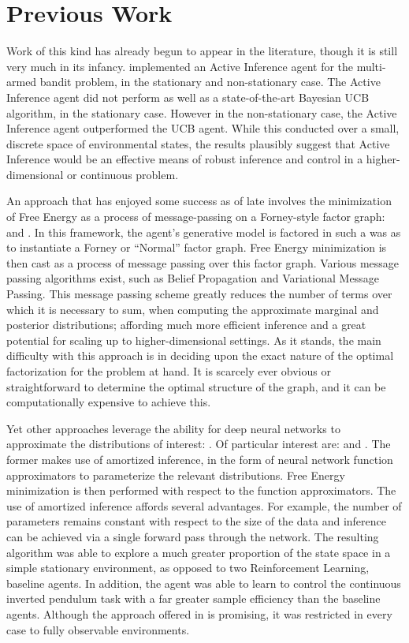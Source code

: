 \documentclass[12pt, oneside]{article}
\begin{document}
\section{Previous Work}
Work of this kind has already begun to appear in the literature, though it is still very much in its infancy. \textcite{Markovi-2021} implemented an Active Inference agent for the multi-armed bandit problem, in the stationary and non-stationary case. The Active Inference agent did not perform as well as a state-of-the-art Bayesian UCB algorithm, in the stationary case. However in the non-stationary case, the Active Inference agent outperformed the UCB agent. While this conducted over a small, discrete space of environmental states, the results plausibly suggest that Active Inference would be an effective means of robust inference and control in a higher-dimensional or continuous problem.  

An approach that has enjoyed some success as of late involves the minimization of Free Energy as a process of message-passing on a Forney-style factor graph: \textcite{Cox-2019} and \textcite{Reactive-MP}. In this framework, the agent's generative model is factored in such a was as to instantiate a Forney or ``Normal'' factor graph. Free Energy minimization is then cast as a process of message passing over this factor graph. Various message passing algorithms exist, such as Belief Propagation and Variational Message Passing. This message passing scheme greatly reduces the number of terms over which it is necessary to sum, when computing the approximate marginal and posterior distributions; affording much more efficient inference and a great potential for scaling up to higher-dimensional settings. As it stands, the main difficulty with this approach is in deciding upon the exact nature of the optimal factorization for the problem at hand. It is scarcely ever obvious or straightforward to determine the optimal structure of the graph, and it can be computationally expensive to achieve this.   

Yet other approaches leverage the ability for deep neural networks to approximate the distributions of interest: \textcite{Deep-AIF-Ueltzh-2018}. Of particular interest are: \textcite{Scaling-AIF} and \textcite{Contrastive-AIF}. The former makes use of amortized inference, in the form of neural network function approximators to parameterize the relevant distributions. Free Energy minimization is then performed with respect to the function approximators. The use of amortized inference affords several advantages. For example, the number of parameters remains constant with respect to the size of the data and inference can be achieved via a single forward pass through the network. The resulting algorithm was able to explore a much greater proportion of the state space in a simple stationary environment, as opposed to two Reinforcement Learning, baseline agents. In addition, the agent was able to learn to control the continuous inverted pendulum task with a far greater sample efficiency than the baseline agents. Although the approach offered in \textcite{Scaling-AIF} is promising, it was restricted in every case to fully observable environments. 
\end{document}
